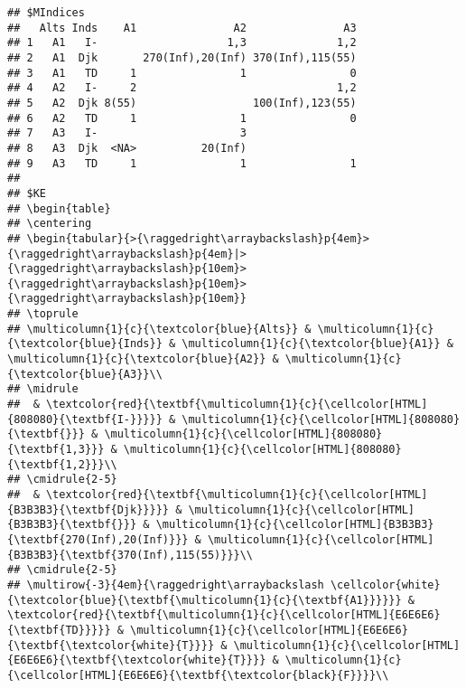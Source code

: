 \documentclass[
]{article}
\newenvironment{Shaded}{\begin{snugshade}}{\end{snugshade}}
\newcommand{\NormalTok}[1]{#1}
\newcommand{\SpecialCharTok}[1]{\textcolor[rgb]{0.00,0.00,0.00}{#1}}
\begin{document}
\begin{Shaded}
\end{Shaded}

\begin{verbatim}
## $MIndices
##   Alts Inds    A1               A2               A3
## 1   A1   I-                    1,3              1,2
## 2   A1  Djk       270(Inf),20(Inf) 370(Inf),115(55)
## 3   A1   TD     1                1                0
## 4   A2   I-     2                               1,2
## 5   A2  Djk 8(55)                  100(Inf),123(55)
## 6   A2   TD     1                1                0
## 7   A3   I-                      3                 
## 8   A3  Djk  <NA>          20(Inf)                 
## 9   A3   TD     1                1                1
## 
## $KE
## \begin{table}
## \centering
## \begin{tabular}{>{\raggedright\arraybackslash}p{4em}>{\raggedright\arraybackslash}p{4em}|>{\raggedright\arraybackslash}p{10em}>{\raggedright\arraybackslash}p{10em}>{\raggedright\arraybackslash}p{10em}}
## \toprule
## \multicolumn{1}{c}{\textcolor{blue}{Alts}} & \multicolumn{1}{c}{\textcolor{blue}{Inds}} & \multicolumn{1}{c}{\textcolor{blue}{A1}} & \multicolumn{1}{c}{\textcolor{blue}{A2}} & \multicolumn{1}{c}{\textcolor{blue}{A3}}\\
## \midrule
##  & \textcolor{red}{\textbf{\multicolumn{1}{c}{\cellcolor[HTML]{808080}{\textbf{I-}}}}} & \multicolumn{1}{c}{\cellcolor[HTML]{808080}{\textbf{}}} & \multicolumn{1}{c}{\cellcolor[HTML]{808080}{\textbf{1,3}}} & \multicolumn{1}{c}{\cellcolor[HTML]{808080}{\textbf{1,2}}}\\
## \cmidrule{2-5}
##  & \textcolor{red}{\textbf{\multicolumn{1}{c}{\cellcolor[HTML]{B3B3B3}{\textbf{Djk}}}}} & \multicolumn{1}{c}{\cellcolor[HTML]{B3B3B3}{\textbf{}}} & \multicolumn{1}{c}{\cellcolor[HTML]{B3B3B3}{\textbf{270(Inf),20(Inf)}}} & \multicolumn{1}{c}{\cellcolor[HTML]{B3B3B3}{\textbf{370(Inf),115(55)}}}\\
## \cmidrule{2-5}
## \multirow{-3}{4em}{\raggedright\arraybackslash \cellcolor{white}{\textcolor{blue}{\textbf{\multicolumn{1}{c}{\textbf{A1}}}}}} & \textcolor{red}{\textbf{\multicolumn{1}{c}{\cellcolor[HTML]{E6E6E6}{\textbf{TD}}}}} & \multicolumn{1}{c}{\cellcolor[HTML]{E6E6E6}{\textbf{\textcolor{white}{T}}}} & \multicolumn{1}{c}{\cellcolor[HTML]{E6E6E6}{\textbf{\textcolor{white}{T}}}} & \multicolumn{1}{c}{\cellcolor[HTML]{E6E6E6}{\textbf{\textcolor{black}{F}}}}\\

\end{verbatim}
\end{document}
